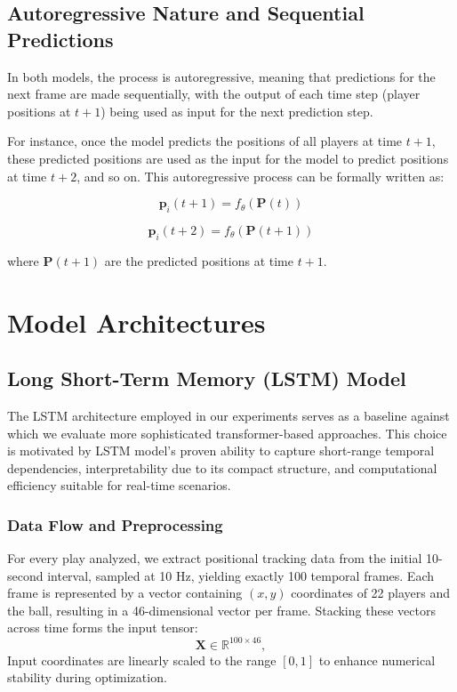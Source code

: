 \documentclass[sigconf]{acmart}
\begin{document}
\subsection{Autoregressive Nature and Sequential Predictions}

In both models, the process is autoregressive, meaning that predictions for the next frame are made sequentially, with the output of each time step (player positions at $t+1$) being used as input for the next prediction step.

For instance, once the model predicts the positions of all players at time $t+1$, these predicted positions are used as the input for the model to predict positions at time $t+2$, and so on. This autoregressive process can be formally written as:

\[
\mathbf{p}_i(t+1) = f_{\theta} \left( \mathbf{P}(t) \right)
\]

\[
\mathbf{p}_i(t+2) = f_{\theta} \left( \mathbf{P}(t+1) \right)
\]

where $\mathbf{P}(t+1)$ are the predicted positions at time $t+1$.

\section{Model Architectures}

\subsection{Long Short-Term Memory (LSTM) Model}

The LSTM architecture employed in our experiments serves as a baseline against which we evaluate more sophisticated transformer-based approaches. This choice is motivated by LSTM model's proven ability to capture short-range temporal dependencies, interpretability due to its compact structure, and computational efficiency suitable for real-time scenarios.

\subsubsection{Data Flow and Preprocessing}

For every play analyzed, we extract positional tracking data from the initial 10-second interval, sampled at 10 Hz, yielding exactly 100 temporal frames. Each frame is represented by a vector containing \((x,y)\) coordinates of 22 players and the ball, resulting in a 46-dimensional vector per frame. Stacking these vectors across time forms the input tensor:
\[
\mathbf{X} \in \mathbb{R}^{100 \times 46},
\]
Input coordinates are linearly scaled to the range \([0, 1]\) to enhance numerical stability during optimization.
\end{document}
